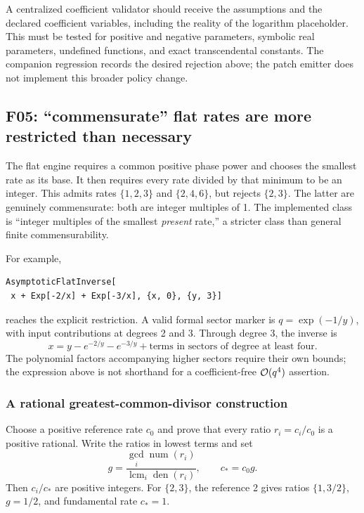 A centralized coefficient validator should receive the assumptions and the declared coefficient variables, including the reality of the logarithm placeholder. This must be tested for positive and negative parameters, symbolic real parameters, undefined functions, and exact transcendental constants. The companion regression records the desired rejection above; the patch emitter does not implement this broader policy change.

\subsection{F05: ``commensurate'' flat rates are more restricted than necessary}
\label{sec:f05}


\cite{flat}

The flat engine requires a common positive phase power and chooses the smallest rate as its base. It then requires every rate divided by that minimum to be an integer. This admits rates $\{1,2,3\}$ and $\{2,4,6\}$, but rejects $\{2,3\}$. The latter are genuinely commensurate: both are integer multiples of 1. The implemented class is ``integer multiples of the smallest \emph{present} rate,'' a stricter class than general finite commensurability.

For example,
\begin{lstlisting}
AsymptoticFlatInverse[
 x + Exp[-2/x] + Exp[-3/x], {x, 0}, {y, 3}]
\end{lstlisting}
reaches the explicit  restriction. A valid formal sector marker is $q=\exp(-1/y)$, with input contributions at degrees 2 and 3. Through degree 3, the inverse is
\[
 x=y-e^{-2/y}-e^{-3/y}+
       \text{terms in sectors of degree at least four}.
\]
The polynomial factors accompanying higher sectors require their own bounds; the expression above is not shorthand for a coefficient-free $\mathcal O(q^4)$ assertion.

\subsubsection*{A rational greatest-common-divisor construction}

Choose a positive reference rate $c_0$ and prove that every ratio $r_i=c_i/c_0$ is a positive rational. Write the ratios in lowest terms and set
\[
 g=\frac{\gcd_i\operatorname{num}(r_i)}
         {\operatorname{lcm}_i\operatorname{den}(r_i)},\qquad
 c_*=c_0g.
\]
Then $c_i/c_*$ are positive integers. For $\{2,3\}$, the reference 2 gives ratios $\{1,3/2\}$, $g=1/2$, and fundamental rate $c_*=1$.

